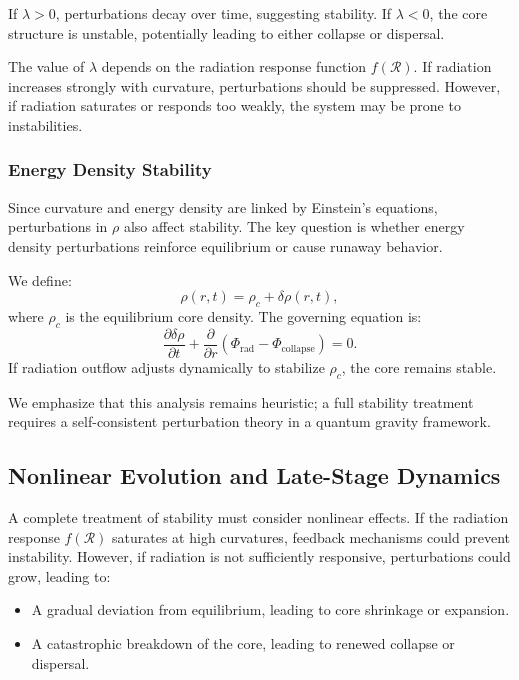 If \( \lambda > 0 \), perturbations decay over time, suggesting stability. If \( \lambda < 0 \), the core structure is unstable, potentially leading to either collapse or dispersal.

The value of \( \lambda \) depends on the radiation response function \( f(\mathcal{R}) \). If radiation increases strongly with curvature, perturbations should be suppressed. However, if radiation saturates or responds too weakly, the system may be prone to instabilities.

\subsubsection{Energy Density Stability}
Since curvature and energy density are linked by Einstein's equations, perturbations in \( \rho \) also affect stability. The key question is whether energy density perturbations reinforce equilibrium or cause runaway behavior.

We define:
\begin{equation}
    \rho(r,t) = \rho_c + \delta \rho(r,t),
\end{equation}
where \( \rho_c \) is the equilibrium core density. The governing equation is:
\begin{equation}
    \frac{\partial \delta \rho}{\partial t} + \frac{\partial}{\partial r} \left( \Phi_\text{rad} - \Phi_\text{collapse} \right) = 0.
\end{equation}
If radiation outflow adjusts dynamically to stabilize \( \rho_c \), the core remains stable.

We emphasize that this analysis remains heuristic; a full stability treatment requires a self-consistent perturbation theory in a quantum gravity framework.

\subsection{Nonlinear Evolution and Late-Stage Dynamics}
A complete treatment of stability must consider nonlinear effects. If the radiation response \( f(\mathcal{R}) \) saturates at high curvatures, feedback mechanisms could prevent instability. However, if radiation is not sufficiently responsive, perturbations could grow, leading to:
\begin{itemize}
    \item A gradual deviation from equilibrium, leading to core shrinkage or expansion.
    \item A catastrophic breakdown of the core, leading to renewed collapse or dispersal.
\end{itemize}

